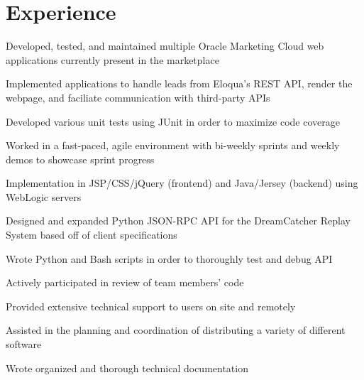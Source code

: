 \documentclass[letterpaper]{deedy-resume}
\begin{document}
%
\begin{minipage}[t]{0.66\textwidth}

\section{Experience}


\vspace{\topsep}
\begin{tightitemize}
\item Developed, tested, and maintained multiple Oracle Marketing Cloud web applications currently present in the marketplace
\item Implemented applications to handle leads from Eloqua's REST API, render the webpage, and faciliate communication with third-party APIs
\item Developed various unit tests using JUnit in order to maximize code coverage
\item Worked in a fast-paced, agile environment with bi-weekly sprints and weekly demos to showcase sprint progress
\item  Implementation in JSP/CSS/jQuery (frontend) and Java/Jersey (backend) using WebLogic servers
\end{tightitemize}

\sectionspace


\begin{tightitemize}
\item Designed and expanded Python JSON-RPC API for the DreamCatcher Replay System based off of client specifications
\item Wrote Python and Bash scripts in order to thoroughly test and debug API
\item Actively participated in review of team members' code
\end{tightitemize}

\sectionspace


\begin{tightitemize}
\item Provided extensive technical support to users on site and remotely
\item Assisted in the planning and coordination of distributing a variety of different software
\item Wrote organized and thorough technical documentation
\end{tightitemize}


\end{minipage}
\end{document}
